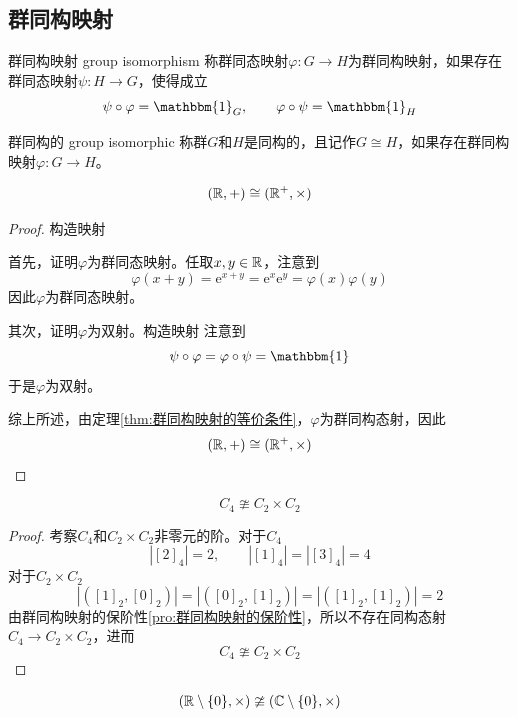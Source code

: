 \subsection{群同构映射}

\begin{definition}{群同构映射 group isomorphism}
	称群同态映射$\varphi:G\to H$为群同构映射，如果存在群同态映射$\psi:H\to G$，使得成立
	$$
	\psi\circ \varphi=\mathbbm{1}_{G},\qquad
	\varphi\circ \psi=\mathbbm{1}_{H}
	$$
\end{definition}

\begin{definition}{群同构的 group isomorphic}
	称群$G$和$H$是同构的，且记作$G\cong H$，如果存在群同构映射$\varphi:G\to H$。
\end{definition}

\begin{problem}
	$$ 
	(\mathbb{R},+)\cong (\mathbb{R}^+,\times)
	$$
\end{problem}

\begin{proof}
	构造映射
	
	首先，证明$\varphi$为群同态映射。任取$x,y\in\mathbb{R}$，注意到
	$$
	\varphi(x+y)=\mathrm{e}^{x+y}=\mathrm{e}^x\mathrm{e}^y=\varphi(x)\varphi(y)
	$$
	因此$\varphi$为群同态映射。
	
	其次，证明$\varphi$为双射。构造映射
	注意到
	$$
	\psi\circ\varphi=\varphi\circ\psi=\mathbbm{1}
	$$
	于是$\varphi$为双射。
	
	综上所述，由定理\ref{thm:群同构映射的等价条件}，$\varphi$为群同构态射，因此
	\[ 
	(\mathbb{R},+)\cong (\mathbb{R}^+,\times)
	\]
\end{proof}

\begin{problem}
	\[ 
	C_4\ncong C_2\times C_2
	\]
\end{problem}

\begin{proof}
	考察$C_4$和$C_2\times C_2$非零元的阶。对于$C_4$
	$$
	|[2]_4|=2,\qquad
	|[1]_4|=|[3]_4|=4
	$$
	对于$C_2\times C_2$
	$$
	|([1]_2,[0]_2)|=|([0]_2,[1]_2)|=|([1]_2,[1]_2)|=2
	$$
	由群同构映射的保阶性\ref{pro:群同构映射的保阶性}，所以不存在同构态射$C_4\to C_2\times C_2$，进而
	\[ 
	C_4\ncong C_2\times C_2
	 \]
\end{proof}

\begin{problem}
	\[ 
	(\mathbb{R}\setminus\{0\},\times)\ncong (\mathbb{C}\setminus\{0\},\times) 
	\]
\end{problem}

